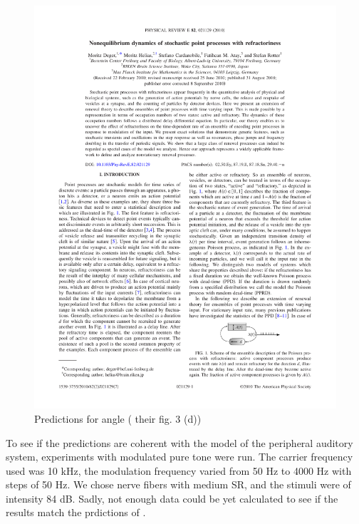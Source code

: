 \begin{figure}[h]
	\centering
	\includegraphics*[page=4,viewport=433 567 566 617]{images/Deger2010.pdf} %
	\caption{Predictions for angle (\cite{Deger} their fig. 3 (d))}
	\label{fig:predangle}
\end{figure}

To see if the predictions are coherent with the model of the peripheral auditory 
system, experiments with modulated pure tone were run. 
The carrier frequency used was 10 kHz, the modulation frequency varied from 50 Hz to 4000 Hz
with steps of 50 Hz. We chose nerve fibers with medium SR, 
and the stimuli were of intensity 84 dB. 
Sadly, not enough data could be yet calculated to see if the results match the prdictions of 
\cite{Deger}.









 